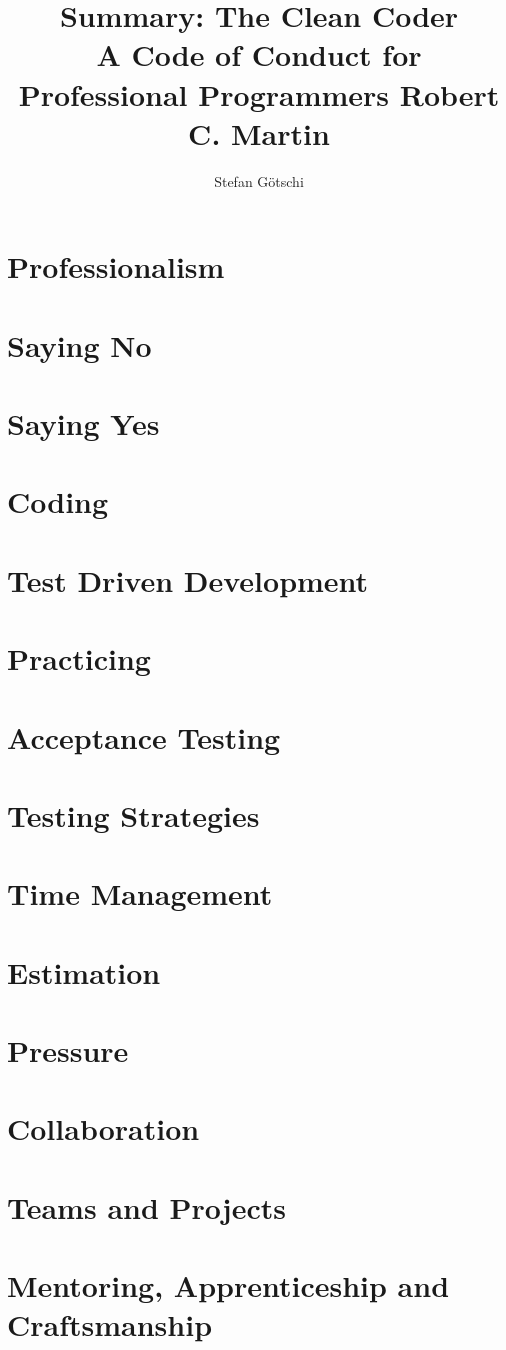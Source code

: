 \documentclass[a4paper, twocolumn]{article}
\title{Summary: The Clean Coder \\
	\large
	A Code of Conduct for Professional Programmers
	Robert C. Martin}
\author{Stefan Götschi}
\begin{document}
\maketitle

\section{Professionalism}

\section{Saying No}

\section{Saying Yes}

\section{Coding}

\section{Test Driven Development}

\section{Practicing}

\section{Acceptance Testing}

\section{Testing Strategies}

\section{Time Management}

\section{Estimation}

\section{Pressure}

\section{Collaboration}

\section{Teams and Projects}

\section{Mentoring, Apprenticeship and Craftsmanship}
\end{document}
